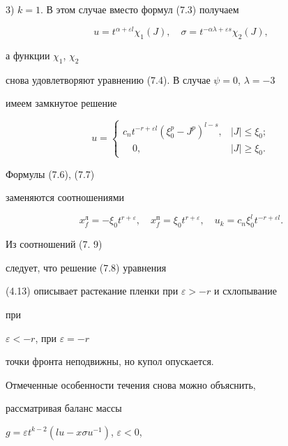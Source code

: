 3) $k=1$. В этом случае вместо формул (7.3) получаем


$$


u=t^{\alpha+\varepsilon l}\chi_1(J),\quad


\sigma=t^{-\alpha\lambda+\varepsilon s}\chi_2(J),


$$


а функции $\chi_1$, $\chi_2$


снова удовлетворяют уравнению (7.4). В случае $\psi=0$, $\lambda=-3$


имеем замкнутое решение


\begin{equation}


u=


\begin{cases}


c_nt^{-r+\varepsilon l}(\xi^p_0-J^p)^{l-s}, &


|J|\le\xi_0;\\


\quad 0, & |J|\ge \xi_0.


\end{cases}


\end{equation}


Формулы (7.6), (7.7)


заменяются соотношениями


\begin{equation}


x^л_f=-\xi_0t^{r+\varepsilon},\quad


x^п_f=\xi_0t^{r+\varepsilon},\quad


u_k=c_n\xi^l_0 t^{-r+\varepsilon l}.


\end{equation}


Из соотношений (7. 9)


следует,  что  решение  (7.8)    уравнения


(4.13) описывает растекание пленки при $\varepsilon>-r$ и схлопывание


при


$\varepsilon<-r$, при $\varepsilon=-r$


точки фронта неподвижны, но купол  опускается.





Отмеченные особенности  течения  снова  можно   объяснить,


рассматривая баланс массы


$g=\varepsilon t^{k-2}(lu-x\sigma u^{-1})$, $\varepsilon<0$,


